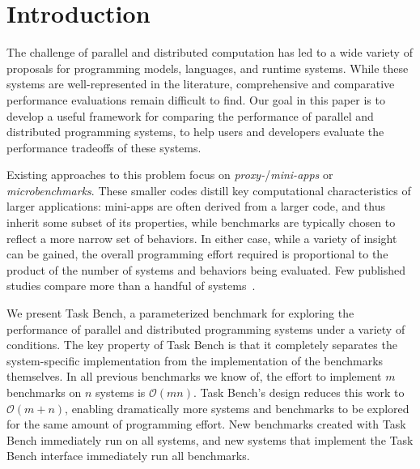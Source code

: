 \section{Introduction}
\label{sec:introduction}

The challenge of parallel and distributed computation has led to a
wide variety of proposals for programming models, languages, and
runtime systems. While these systems are well-represented in the literature, comprehensive and comparative performance evaluations
remain difficult to find. Our
goal in this paper is to develop a useful framework for
comparing the performance of parallel and distributed programming
systems, to help users and developers evaluate the performance tradeoffs of these systems.

{\color{blue}

Existing approaches to this problem focus on \emph{proxy-}/\emph{mini-apps}
or \emph{microbenchmarks}. These smaller codes distill key
computational characteristics of larger applications: mini-apps are
often derived from a larger code, and thus inherit some subset of its
properties, while benchmarks are typically chosen to reflect a more
narrow set of behaviors. In either case, while a variety of insight
can be gained, the overall programming effort required is proportional to the
product of the number of systems and behaviors being
evaluated. Few published studies compare more than a
handful of systems~\cite{LULESH13, Deakin19}.

}


We present Task Bench, a parameterized benchmark for exploring the performance
of parallel and distributed programming systems under a
variety of conditions.  The key property of Task Bench is that it completely separates
the system-specific implementation from the implementation
of the benchmarks themselves.
In all previous benchmarks we know of, the effort to implement $m$ benchmarks on $n$
systems is $\mathcal{O}(mn)$.  Task Bench's design reduces this work to $\mathcal{O}(m + n)$,
enabling dramatically more systems and benchmarks to be explored for the same amount of programming
effort.  New benchmarks created with Task Bench
immediately run on all systems, and new systems that implement the Task Bench interface immediately run all
benchmarks. 

